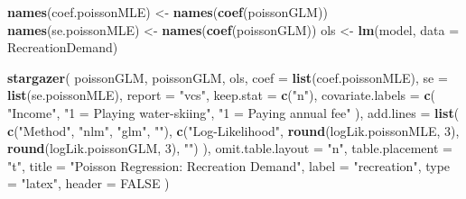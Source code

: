 \documentclass[
  12pt,
]{article}
\newenvironment{Shaded}{\begin{snugshade}}{\end{snugshade}}
\newcommand{\DataTypeTok}[1]{\textcolor[rgb]{0.13,0.29,0.53}{#1}}
\newcommand{\DecValTok}[1]{\textcolor[rgb]{0.00,0.00,0.81}{#1}}
\newcommand{\KeywordTok}[1]{\textcolor[rgb]{0.13,0.29,0.53}{\textbf{#1}}}
\newcommand{\NormalTok}[1]{#1}
\newcommand{\OtherTok}[1]{\textcolor[rgb]{0.56,0.35,0.01}{#1}}
\newcommand{\StringTok}[1]{\textcolor[rgb]{0.31,0.60,0.02}{#1}}
\begin{document}
\begin{Shaded}
\begin{Highlighting}[]
\KeywordTok{names}\NormalTok{(coef.poissonMLE) \textless{}{-}}\StringTok{ }\KeywordTok{names}\NormalTok{(}\KeywordTok{coef}\NormalTok{(poissonGLM))}
\KeywordTok{names}\NormalTok{(se.poissonMLE) \textless{}{-}}\StringTok{ }\KeywordTok{names}\NormalTok{(}\KeywordTok{coef}\NormalTok{(poissonGLM))}
\NormalTok{ols \textless{}{-}}\StringTok{ }\KeywordTok{lm}\NormalTok{(model, }\DataTypeTok{data =}\NormalTok{ RecreationDemand)}

\KeywordTok{stargazer}\NormalTok{(}
\NormalTok{  poissonGLM, poissonGLM, ols,}
  \DataTypeTok{coef =} \KeywordTok{list}\NormalTok{(coef.poissonMLE),}
  \DataTypeTok{se =} \KeywordTok{list}\NormalTok{(se.poissonMLE),}
  \DataTypeTok{report =} \StringTok{"vcs"}\NormalTok{, }\DataTypeTok{keep.stat =} \KeywordTok{c}\NormalTok{(}\StringTok{"n"}\NormalTok{),}
  \DataTypeTok{covariate.labels =} \KeywordTok{c}\NormalTok{(}
    \StringTok{"Income"}\NormalTok{,}
    \StringTok{"1 = Playing water{-}skiing"}\NormalTok{,}
    \StringTok{"1 = Paying annual fee"}
\NormalTok{  ),}
  \DataTypeTok{add.lines =} \KeywordTok{list}\NormalTok{(}
    \KeywordTok{c}\NormalTok{(}\StringTok{"Method"}\NormalTok{, }\StringTok{"nlm"}\NormalTok{, }\StringTok{"glm"}\NormalTok{, }\StringTok{""}\NormalTok{),}
    \KeywordTok{c}\NormalTok{(}\StringTok{"Log{-}Likelihood"}\NormalTok{, }
      \KeywordTok{round}\NormalTok{(logLik.poissonMLE, }\DecValTok{3}\NormalTok{), }\KeywordTok{round}\NormalTok{(logLik.poissonGLM, }\DecValTok{3}\NormalTok{), }\StringTok{""}\NormalTok{)}
\NormalTok{  ),}
  \DataTypeTok{omit.table.layout =} \StringTok{"n"}\NormalTok{, }\DataTypeTok{table.placement =} \StringTok{"t"}\NormalTok{,}
  \DataTypeTok{title =} \StringTok{"Poisson Regression: Recreation Demand"}\NormalTok{,}
  \DataTypeTok{label =} \StringTok{"recreation"}\NormalTok{, }
  \DataTypeTok{type =} \StringTok{"latex"}\NormalTok{, }\DataTypeTok{header =} \OtherTok{FALSE}  
\NormalTok{)}
\end{Highlighting}
\end{Shaded}
\end{document}
